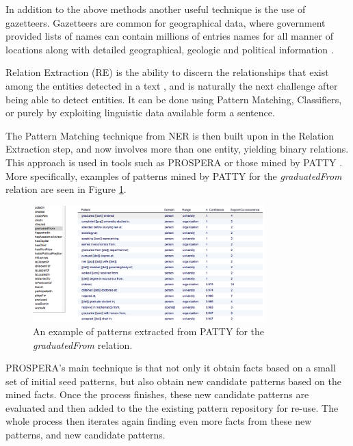 \documentclass[11pt,a4paper,openright]{memoir}
\begin{document}
In addition to the above methods another useful technique is the use of gazetteers. Gazetteers are common for geographical data, where government provided lists of names can contain millions of entries names for all manner of locations along with detailed geographical, geologic and political information \cite{Jurafsky:2000:SLP:555733}.

Relation Extraction (RE) is the ability to discern the relationships that exist among the entities detected in a text \cite{Jurafsky:2000:SLP:555733}, and is naturally the next challenge after being able to detect entities. It can be done using Pattern Matching, Classifiers, or purely by exploiting linguistic data available form a sentence.

The Pattern Matching technique from NER is then built upon in the Relation Extraction step, and now involves more than one entity, yielding binary relations. This approach is used in tools such as PROSPERA \cite{Nakashole:2011:SKH:1935826.1935869} or those mined by PATTY \cite{Nakashole:2012:PTR:2390948.2391076}. More specifically, examples of patterns mined by PATTY for the \emph{graduatedFrom} relation are seen in Figure \ref{fig:patty_examples}.

\begin{figure}[!htbp]
  \centering
    \includegraphics[width=0.8\textwidth]{./images/patty}
  \caption[An example of patterns extracted from PATTY.]{An example of patterns extracted from PATTY for the \emph{graduatedFrom} relation.}
  \label{fig:patty_examples}
\end{figure}

PROSPERA's main technique is that not only it obtain facts based on a small set of initial seed patterns, but also obtain new candidate patterns based on the mined facts. Once the process finishes, these new candidate patterns are evaluated and then added to the the existing pattern repository for re-use. The whole process then iterates again finding even more facts from these new patterns, and new candidate patterns.
\end{document}
